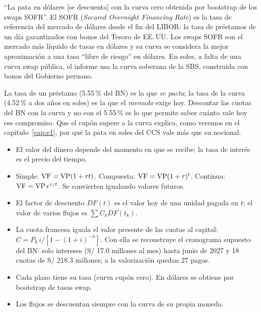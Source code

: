\begin{informe}
\enquote{La pata en dólares [se descuenta] con la curva cero obtenida por bootstrap de los swaps SOFR}. El SOFR (\emph{Secured Overnight Financing Rate}) es la tasa de referencia del mercado de dólares desde el fin del LIBOR: la tasa de préstamos de un día garantizados con bonos del Tesoro de EE.\,UU. Los swaps SOFR son el mercado más líquido de tasas en dólares y su curva se considera la mejor aproximación a una tasa \enquote{libre de riesgo} en dólares. En soles, a falta de una curva swap pública, el informe usa la curva soberana de la SBS, construida con bonos del Gobierno peruano.
\end{informe}

\begin{cuidado}
La tasa de un préstamo (5.55\,\% del BN) es la que \emph{se pacta}; la tasa de la curva (4.52\,\% a dos años en soles) es la que el \emph{mercado} exige hoy. Descontar las cuotas del BN con la curva y no con el 5.55\,\% es lo que permite saber cuánto vale hoy ese compromiso. Que el cupón supere a la curva explica, como veremos en el capítulo~\ref{cap:e1}, por qué la pata en soles del CCS vale más que su nocional.
\end{cuidado}

\begin{resumen}
\begin{itemize}
\item El valor del dinero depende del momento en que se recibe; la tasa de interés es el precio del tiempo.
\item Simple: $\operatorname{VF}=\operatorname{VP}(1+rt)$. Compuesta: $\operatorname{VF}=\operatorname{VP}(1+r)^t$. Continua: $\operatorname{VF}=\operatorname{VP} e^{r_c t}$. Se convierten igualando valores futuros.
\item El factor de descuento $DF(t)$ es el valor hoy de una unidad pagada en $t$; el valor de varios flujos es $\sum C_k DF(t_k)$.
\item La cuota francesa iguala el valor presente de las cuotas al capital: $C=P_0\,i/[1-(1+i)^{-n}]$. Con ella se reconstruye el cronograma supuesto del BN: solo intereses (S/ 17.0 millones al mes) hasta junio de 2027 y 18 cuotas de S/ 218.3 millones; a la valorización quedan 27 pagos.
\item Cada plazo tiene su tasa (curva cupón cero). En dólares se obtiene por bootstrap de tasas swap.
\item Los flujos se descuentan siempre con la curva de su propia moneda.
\end{itemize}
\end{resumen}


